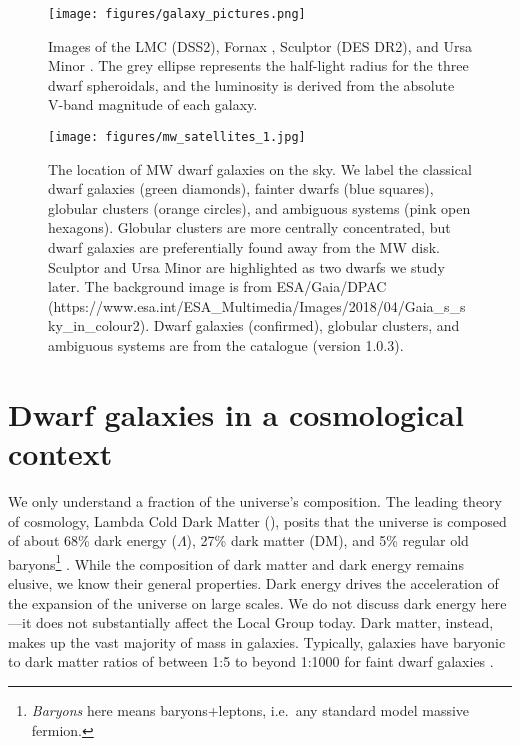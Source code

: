\begin{figure}
\centering
\texttt{[image: figures/galaxy\_pictures.png]}
\caption[Images of dwarf galaxies]{Images of the LMC (DSS2), Fornax
\citep[DES DR2,][]{abbott+2021}, Sculptor (DES DR2), and Ursa Minor
\citep[UNWISE,][with \textit{Gaia} point sources
over-plotted]{lang2014, meisner+lang+schlegel2017, meisner+lang+schlegel2017a}.
The grey ellipse represents the half-light radius for the three dwarf
spheroidals, and the luminosity is derived from the absolute V-band
magnitude of each galaxy.}\label{fig:galaxy_images}
\end{figure}

\begin{figure}
\centering
\texttt{[image: figures/mw\_satellites\_1.jpg]}
\caption[The on-sky distribution of Milky Way satellites]{The location
of MW dwarf galaxies on the sky. We label the classical dwarf galaxies
(green diamonds), fainter dwarfs (blue squares), globular clusters
(orange circles), and ambiguous systems (pink open hexagons). Globular
clusters are more centrally concentrated, but dwarf galaxies are
preferentially found away from the MW disk. Sculptor and Ursa Minor are
highlighted as two dwarfs we study later. The background image is from
ESA/Gaia/DPAC
(https://www.esa.int/ESA\_Multimedia/Images/2018/04/Gaia\_s\_sky\_in\_colour2).
Dwarf galaxies (confirmed), globular clusters, and ambiguous systems are
from the \citet{pace2024} catalogue (version
1.0.3).}\label{fig:mw_satellite_system}
\end{figure}

\section{Dwarf galaxies in a cosmological
context}\label{dwarf-galaxies-in-a-cosmological-context}

We only understand a fraction of the universe's composition. The leading
theory of cosmology, Lambda Cold Dark Matter (\LCDM{}), posits that the
universe is composed of about 68\% dark energy (\(\Lambda\)), 27\% dark
matter (DM), and 5\% regular old baryons\footnote{\emph{Baryons} here
  means baryons+leptons, i.e.~any standard model massive fermion.}
\citep{planckcollaboration+2020}. While the composition of dark matter
and dark energy remains elusive, we know their general properties. Dark
energy drives the acceleration of the expansion of the universe on large
scales. We do not discuss dark energy here---it does not substantially
affect the Local Group today. Dark matter, instead, makes up the vast
majority of mass in galaxies. Typically, galaxies have baryonic to dark
matter ratios of between 1:5 to beyond 1:1000 for faint dwarf galaxies
\citep[e.g.,][]{hayashi+2023}.

